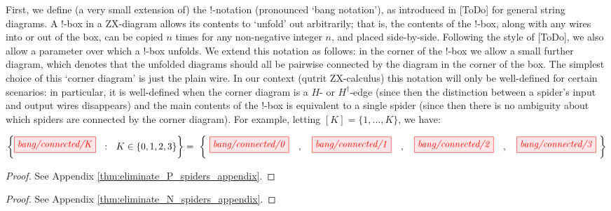 First, we define (a very small extension of) the !-notation (pronounced `bang notation'), as introduced in [ToDo] for general string diagrams. A !-box in a ZX-diagram allows its contents to `unfold' out arbitrarily; that is, the contents of the !-box, along with any wires into or out of the box, can be copied $n$ times for any non-negative integer $n$, and placed side-by-side. Following the style of [ToDo], we also allow a parameter over which a !-box unfolds. We extend this notation as follows: in the corner of the !-box we allow a small further diagram, which denotes that the unfolded diagrams should all be pairwise connected by the diagram in the corner of the box. The simplest choice of this `corner diagram' is just the plain wire. In our context (qutrit ZX-calculus) this notation will only be well-defined for certain scenarios: in particular, it is well-defined when the corner diagram is a $H$- or $H^{\dagger}$-edge (since then the distinction between a spider's input and output wires disappears) and the main contents of the !-box is equivalent to a single spider (since then there is no ambiguity about which spiders are connected by the corner diagram). For example, letting $[K] = \{1, ..., K\}$, we have: 

\begin{equation*}
	\left\{ \tikzfig{bang/connected/K} ~~ : ~~ K \in \{0, 1, 2, 3\} \right\} = \ 
	\left\{ ~
		\tikzfig{bang/connected/0} \quad , \quad
		\tikzfig{bang/connected/1} \quad , \quad
		\tikzfig{bang/connected/2} \quad , \quad
		\tikzfig{bang/connected/3}
	~ \right\}
\end{equation*}

\begin{theorem}\label{thm:eliminate_P_spiders}
	\eliminatePSpidersStatement
	\begin{proof}
		See Appendix \ref{thm:eliminate_P_spiders_appendix}.
	\end{proof}
\end{theorem}

\begin{theorem}\label{thm:eliminate_N_spiders}
	\eliminateNSpidersStatement
	\begin{proof}
		See Appendix \ref{thm:eliminate_N_spiders_appendix}.
	\end{proof}
\end{theorem}

